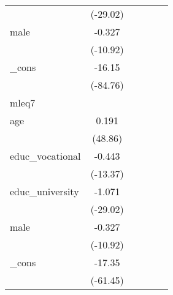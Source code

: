 {\begin{tabular}{l*{5}{c}}
            &    (-29.02)         &                     &                     &                     &                     \\
[1em]
male        &      -0.327\sym{***}&                     &                     &                     &                     \\
            &    (-10.92)         &                     &                     &                     &                     \\
[1em]
\_cons      &      -16.15\sym{***}&                     &                     &                     &                     \\
            &    (-84.76)         &                     &                     &                     &                     \\
\hline
mleq7       &                     &                     &                     &                     &                     \\
age         &       0.191\sym{***}&                     &                     &                     &                     \\
            &     (48.86)         &                     &                     &                     &                     \\
[1em]
educ\_vocational&      -0.443\sym{***}&                     &                     &                     &                     \\
            &    (-13.37)         &                     &                     &                     &                     \\
[1em]
educ\_university&      -1.071\sym{***}&                     &                     &                     &                     \\
            &    (-29.02)         &                     &                     &                     &                     \\
[1em]
male        &      -0.327\sym{***}&                     &                     &                     &                     \\
            &    (-10.92)         &                     &                     &                     &                     \\
[1em]
\_cons      &      -17.35\sym{***}&                     &                     &                     &                     \\
            &    (-61.45)         &                     &                     &                     &                     \\

\end{tabular}}
